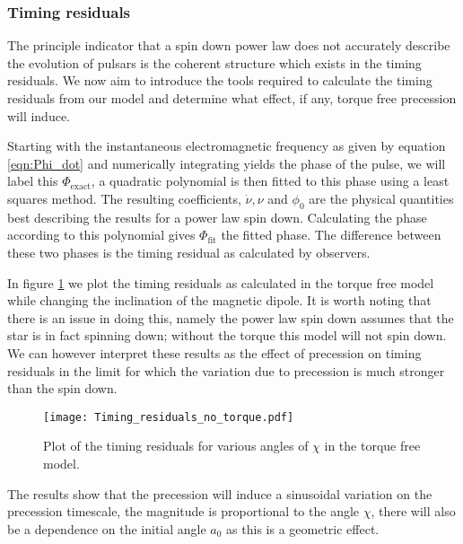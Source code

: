 \documentclass[/home/greg/Thesis/main/main.tex]{subfiles}
\begin{document}
\subsubsection{Timing residuals}
The principle indicator that a spin down power law does not accurately describe the evolution of pulsars is the coherent structure which exists in the timing residuals. We now aim to introduce the tools required to calculate the timing residuals from our model and determine what effect, if any, torque free precession will induce. 

Starting with the instantaneous electromagnetic frequency as given by equation \eqref{eqn:Phi_dot} %
and numerically integrating yields the phase of the pulse, we will label this $\Phi_{\textrm{exact}}$, a quadratic polynomial is then fitted to this phase using a least squares method. The resulting coefficients, $\dot{\nu}, \nu$ and $\phi_{0}$ are the physical quantities best describing the results for a power law spin down. Calculating the phase according to this polynomial gives $\Phi_{\textrm{fit}}$ the fitted phase. The difference between these two phases is the timing residual as calculated by observers. 

In figure \ref{fig:TR no torque} we plot the timing residuals as calculated in the torque free model while changing the inclination of the magnetic dipole. It is worth noting that there is an issue in doing this, namely the power law spin down assumes that the star is in fact spinning down; without the torque this model will not spin down. We can however interpret these results as the effect of precession on timing residuals in the limit for which the variation due to precession is much stronger than the spin down.%

\begin{figure}[ht]
\centering
	\texttt{[image: Timing\_residuals\_no\_torque.pdf]}
\caption{Plot of the timing residuals for various angles of $\chi$ in the torque free model. }
\label{fig:TR no torque}
\end{figure}

The results show that the precession will induce a sinusoidal variation on the precession timescale, the magnitude is proportional to the angle $\chi$, there will also be a dependence on the initial angle $a_{0}$ as this is a geometric effect.
\end{document}
